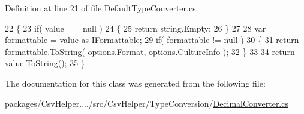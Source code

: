 Definition at line 21 of file Default\-Type\-Converter.\-cs.


\begin{DoxyCode}
22         \{
23             \textcolor{keywordflow}{if}( value == null )
24             \{
25                 \textcolor{keywordflow}{return} string.Empty;
26             \}
27 
28             var formattable = value as IFormattable;
29             \textcolor{keywordflow}{if}( formattable != null )
30             \{
31                 \textcolor{keywordflow}{return} formattable.ToString( options.Format, options.CultureInfo );
32             \}
33 
34             \textcolor{keywordflow}{return} value.ToString();
35         \}
\end{DoxyCode}


The documentation for this class was generated from the following file\-:\begin{DoxyCompactItemize}
\item 
packages/\-Csv\-Helper..../src/\-Csv\-Helper/\-Type\-Conversion/\hyperlink{a00245}{Decimal\-Converter.\-cs}\end{DoxyCompactItemize}
